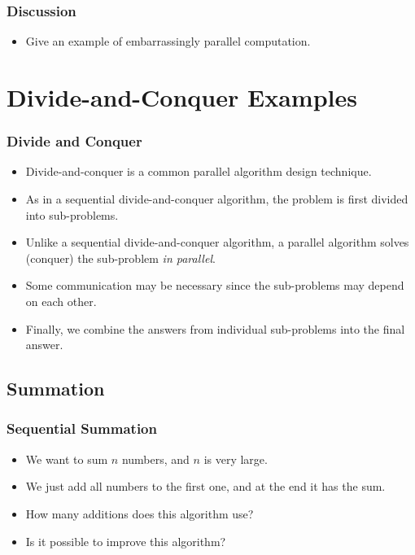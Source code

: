 \documentclass{beamer}
\begin{document}
\begin{CJK}{UTF8}{bsmi}
\begin{frame}
\frametitle{Discussion}
\begin{itemize}
\item Give an example of embarrassingly parallel computation.
\end{itemize}
\end{frame}

\section{Divide-and-Conquer Examples}

\begin{frame}
\frametitle{Divide and Conquer}
\begin{itemize}
\item Divide-and-conquer is a common parallel algorithm design technique.
\item As in a sequential divide-and-conquer algorithm, the problem is first divided into sub-problems.
\item Unlike a sequential divide-and-conquer algorithm, a parallel algorithm solves (conquer) the sub-problem {\em in parallel}.
\item Some communication may be necessary since the sub-problems may depend on each other.
\item Finally, we combine the answers from individual sub-problems into the final answer.
\end{itemize}
\end{frame}


\subsection{Summation}

\begin{frame}
\frametitle{Sequential Summation}
\begin{itemize}
\item We want to sum $n$ numbers, and $n$ is very large.
\item We just add all numbers to the first one, and at the end it has the sum.
\item How many additions does this algorithm use?
\item Is it possible to improve this algorithm?
\end{itemize}
\end{frame}


\end{CJK}
\end{document}
